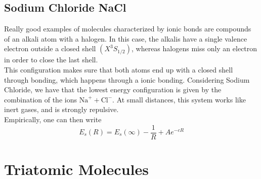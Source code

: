 \documentclass[a4paper, 11pt]{book}
\newcommand{\1}{\opr{\mathds{1}}}
\newcommand{\term}[3][]{^{#3}#2_{#1}}
\theoremstyle{plain}
\begin{document}
	\subsection{Sodium Chloride NaCl}
	Really good examples of molecules characterized by ionic bonds are compounds of an alkali atom with a halogen. In this case, the alkalis have a single valence electron outside a closed shell $(X\term[1/2]{S}{3})$, whereas halogens miss only an electron in order to close the last shell.\\
	This configuration makes sure that both atoms end up with a closed shell through bonding, which happens through a ionic bonding. Considering Sodium Chloride, we have that the lowest energy configuration is given by the combination of the ions $\mathrm{Na}^++\mathrm{Cl}^-$. At small distances, this system works like inert gases, and is strongly repulsive.\\
	Empirically, one can then write
	\begin{equation}
		E_s(R)=E_s(\infty)-\frac{1}{R}+Ae^{-cR}
		\label{eq:naclrepulsion}
	\end{equation}
	\section{Triatomic Molecules}
\end{document}
